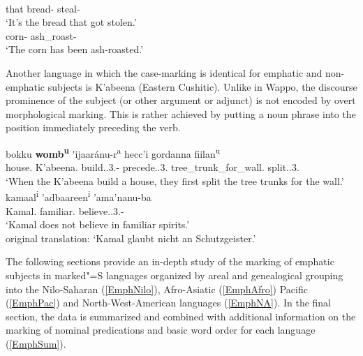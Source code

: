 \begin{exe}\ex\label{WapFoc}
\begin{xlist}
\ex\gll{}   \\
that bread-\nom{} \foc{} steal-\pass{}\\
\glt `It's the bread that got stolen.'
\ex\gll{} \\
corn-\nom{} ash\_roast-\pass{}\\
\glt `The corn has been ash-roasted.'
\end{xlist}
\end{exe}

Another language in which the case-marking is identical for emphatic and non-emphatic subjects is K'abeena (Eastern Cushitic).
Unlike in Wappo, the discourse prominence of the subject (or other argument or adjunct) is not encoded by overt morphological marking. 
This is rather achieved by putting a noun phrase into the position immediately preceding the verb.

\begin{exe}\ex{}
\begin{xlist}\ex\raggedright \gll bokku \textbf{womb\textsuperscript{u}} \'{}ijaar\'anu-r\textsuperscript{a} hecc'i gordanna fiilan\textsuperscript{u}\\
house.\acc{} K'abeena.\nom{} build.\ipfv{}.3\sg{}.\mas{}-\tmp{} precede.\cvb{}.3\sg{}.\mas{} tree\_trunk\_for\_wall.\acc{} split.\ipfv{}.3\sg{}.\mas{}\\
\glt `When the K'abeena build a house, they first split the tree trunks for the wall.'%
\ex\gll kamaal\textsuperscript{i} 'adbaareen\textsuperscript{i} 'ama'nanu-ba\\
Kamal.\nom{} familiar.\loc{} believe.\ipfv{}.3\sg{}.\mas{}-\Neg{}\\
\glt `Kamal does not believe in familiar spirits.'\\
 original translation: `Kamal glaubt nicht an Schutzgeister.'
\end{xlist}
\end{exe}

The following sections provide an in-depth study of the marking of emphatic subjects in marked"=S languages organized by areal and genealogical grouping into the Nilo-Saharan (\ref{EmphNilo}), Afro-Asiatic (\ref{EmphAfro}) Pacific (\ref{EmphPac}) and North-West-Ame\-ri\-can languages (\ref{EmphNA}). 
In the final section, the data is summarized and combined with additional information on the marking of nominal predications and basic word order for each language (\ref{EmphSum}).

